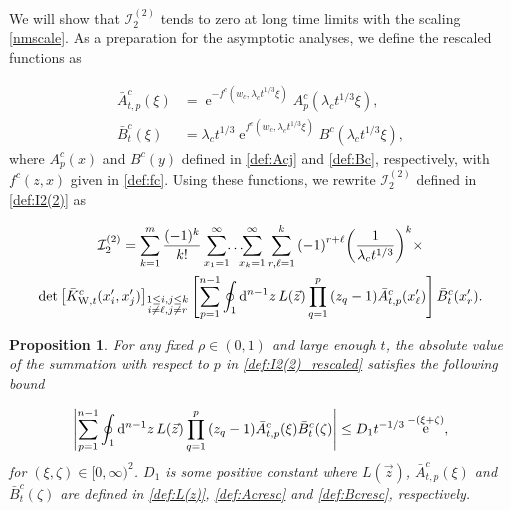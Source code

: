 \documentclass[cmp]{svjour}
\numberwithin{theorem}{section}
\numberwithin{equation}{section}
\DeclareMathOperator{\e}{e}
\def\dd{{\rm d}}
\newtheorem{prop}[theorem]{Proposition}
\begin{document}
We will show that $\mathcal{I}^{(2)}_2$ tends to zero at long time limits with the scaling \eqref{nmscale}.
As a preparation for the asymptotic analyses, we define the rescaled functions as

\begin{align}
\bar{A}^c_{t,p}(\xi) & = \e^{ - f^c(w_c , \lambda_c t^{1/3} \xi) }  A^c_p(\lambda_c t^{1/3} \xi), \label{def:Acresc} \\
\bar{B}^c_{t}(\xi) & = \lambda_c t^{1/3} \e^{f^c(w_c, \lambda_c t^{1/3} \xi)} B^c(\lambda_c t^{1/3} \xi), \label{def:Bcresc}
\end{align}
where $A^c_p(x)$ and $B^c(y)$ defined in \eqref{def:Acj} and \eqref{def:Bc}, respectively, with $f^c(z,x)$ given in \eqref{def:fc}.
Using these functions, we rewrite $\mathcal{I}_2^{(2)}$ defined in  \eqref{def:I2(2)} as

\begin{multline}
\mathcal{I}^{(2)}_2 = \sum_{k=1}^{m} \frac{(-1)^k}{ k! }
\sum_{x_1 = 1}^{\infty}  \!\! \dots \!\!\! \sum_{x_{k} = 1}^{\infty}
\sum_{r,\ell =1}^{k}{ {(-1)}^{r+\ell} {\left( \frac{1}{\lambda_c t^{1/3}} \right)}^k } \times \\ \det\left[  \bar{K}^c_{\mathrm{W},t}(x'_i , x'_j) \right]_{ \substack{ 1 \leq i , j \leq k \\  i \neq \ell , j \neq r } }  \left[ \sum_{p=1}^{n-1}{  \oint_1 \dd^{n-1} z\,  L(\vec{z}) \prod_{q=1}^{p}{ {(z_q - 1)} \bar{A}^c_{t,p}(x'_\ell) }} \right]  \bar{B}^c_t(x'_r)    . \label{def:I2(2)_rescaled} 
\end{multline}



\begin{prop}
\label{I2(2)_up_bound_AB}
For any fixed $\rho \in (0,1)$ and large enough $t$, the absolute value of the summation with respect to $p$ in \eqref{def:I2(2)_rescaled} satisfies the following bound

\begin{equation}
\label{eq:up_bound_AB}
\left| \sum_{p=1}^{n-1}{  \oint_1 \dd^{n-1} z\,  L(\vec{z}) \prod_{q=1}^{p}{ {(z_q - 1)} \bar{A}^c_{t,p}(\xi) }}   \bar{B}^c_t(\zeta) \right| \leq  D_1 t^{-1/3} \e^{-(\xi+\zeta)},
\end{equation}
for $(\xi,\zeta) \in [0 , \infty)^2$. $D_1$ is some positive constant where $L(\vec{z})$,  $\bar{A}^c_{t,p}(\xi)$ and $\bar{B}^c_t(\zeta)$ are defined in \eqref{def:L(z)}, \eqref{def:Acresc} and \eqref{def:Bcresc}, respectively.
\end{prop}
\end{document}
